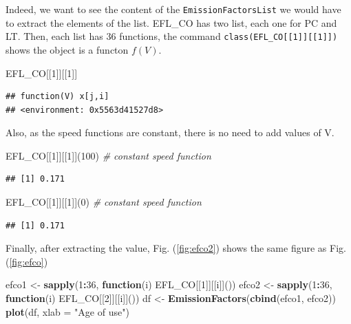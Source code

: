\documentclass[12pt,graybox,envcountchap,sectrefs]{krantz}
\makeatletter
\newenvironment{Shaded}{\begin{snugshade}}{\end{snugshade}}
\newcommand{\KeywordTok}[1]{\textcolor[rgb]{0.13,0.29,0.53}{\textbf{#1}}}
\newcommand{\DataTypeTok}[1]{\textcolor[rgb]{0.13,0.29,0.53}{#1}}
\newcommand{\DecValTok}[1]{\textcolor[rgb]{0.00,0.00,0.81}{#1}}
\newcommand{\StringTok}[1]{\textcolor[rgb]{0.31,0.60,0.02}{#1}}
\newcommand{\CommentTok}[1]{\textcolor[rgb]{0.56,0.35,0.01}{\textit{#1}}}
\newcommand{\ControlFlowTok}[1]{\textcolor[rgb]{0.13,0.29,0.53}{\textbf{#1}}}
\newcommand{\OperatorTok}[1]{\textcolor[rgb]{0.81,0.36,0.00}{\textbf{#1}}}
\newcommand{\NormalTok}[1]{#1}
\newenvironment{kframe}{%
\medskip{}
\setlength{\fboxsep}{.8em}
 \def\at@end@of@kframe{}%
 \ifinner\ifhmode%
  \def\at@end@of@kframe{\end{minipage}}%
  \begin{minipage}{\columnwidth}%
 \fi\fi%
 \def\FrameCommand##1{\hskip\@totalleftmargin \hskip-\fboxsep
 \colorbox{shadecolor}{##1}\hskip-\fboxsep
     \hskip-\linewidth \hskip-\@totalleftmargin \hskip\columnwidth}%
 \MakeFramed {\advance\hsize-\width
   \@totalleftmargin\z@ \linewidth\hsize
   \@setminipage}}%
 {\par\unskip\endMakeFramed%
 \at@end@of@kframe}
\renewenvironment{Shaded}{\begin{kframe}}{\end{kframe}}
\theoremstyle{definition}
\theoremstyle{definition}
\theoremstyle{definition}
\theoremstyle{remark}
\makeatother
\begin{document}
Indeed, we want to see the content of the \texttt{EmissionFactorsList}
we would have to extract the elements of the list. EFL\_CO has two list,
each one for PC and LT. Then, each list has 36 functions, the command
\texttt{class(EFL\_CO{[}{[}1{]}{]}{[}{[}1{]}{]})} shows the object is a
functon \(f(V)\).

\begin{Shaded}
\begin{Highlighting}[]
\NormalTok{EFL_CO[[}\DecValTok{1}\NormalTok{]][[}\DecValTok{1}\NormalTok{]]}
\end{Highlighting}
\end{Shaded}

\begin{verbatim}
## function(V) x[j,i]
## <environment: 0x5563d41527d8>
\end{verbatim}

Also, as the speed functions are constant, there is no need to add
values of V.

\begin{Shaded}
\begin{Highlighting}[]
\NormalTok{EFL_CO[[}\DecValTok{1}\NormalTok{]][[}\DecValTok{1}\NormalTok{]](}\DecValTok{100}\NormalTok{) }\CommentTok{# constant speed function}
\end{Highlighting}
\end{Shaded}

\begin{verbatim}
## [1] 0.171
\end{verbatim}

\begin{Shaded}
\begin{Highlighting}[]
\NormalTok{EFL_CO[[}\DecValTok{1}\NormalTok{]][[}\DecValTok{1}\NormalTok{]](}\DecValTok{0}\NormalTok{)   }\CommentTok{# constant speed function}
\end{Highlighting}
\end{Shaded}

\begin{verbatim}
## [1] 0.171
\end{verbatim}

Finally, after extracting the value, Fig. (\ref{fig:efco2}) shows the
same figure as Fig. (\ref{fig:efco})

\begin{Shaded}
\begin{Highlighting}[]
\NormalTok{efco1 <-}\StringTok{ }\KeywordTok{sapply}\NormalTok{(}\DecValTok{1}\OperatorTok{:}\DecValTok{36}\NormalTok{, }\ControlFlowTok{function}\NormalTok{(i) EFL_CO[[}\DecValTok{1}\NormalTok{]][[i]]())}
\NormalTok{efco2 <-}\StringTok{ }\KeywordTok{sapply}\NormalTok{(}\DecValTok{1}\OperatorTok{:}\DecValTok{36}\NormalTok{, }\ControlFlowTok{function}\NormalTok{(i) EFL_CO[[}\DecValTok{2}\NormalTok{]][[i]]())}
\NormalTok{df <-}\StringTok{ }\KeywordTok{EmissionFactors}\NormalTok{(}\KeywordTok{cbind}\NormalTok{(efco1, efco2))}
\KeywordTok{plot}\NormalTok{(df, }\DataTypeTok{xlab =} \StringTok{"Age of use"}\NormalTok{)}
\end{Highlighting}
\end{Shaded}
\end{document}
